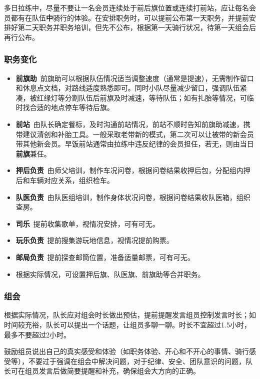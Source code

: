 \documentclass[UTF8]{ctexart}
\begin{document}
多日拉练中，尽量不要让一名会员连续处于前后旗位置或连续打前站，应让每名会员都有在队伍\textbf{中}骑行的体验。在安排职务时，可以提前公布第一天职务，并提前安排好第二天职务并职务培训，但先不公布，根据第一天骑行状况，待第一天组会后再行公布。

\subsubsection{职务变化}

\begin{itemize}[nosep,left=2em]
    \item \textbf{前旗助}\  前旗助可以根据队伍情况适当调整速度（通常是提速），无需制作留口和休息点文档，对路线适度熟悉即可。同时小队尽量减少留口，强调队伍紧凑，被红绿灯等分割队伍后前旗及时减速，等待队伍；如有扎胎等情况，可临时找合适的地点停车等待后旗。
    \item \textbf{前站}\  由队长确定餐标，及时沟通前站情况，前站不顺时告知前旗助减速，携带建议清创和补胎工具。一般采取老带新的模式，第二次可以让被带的新会员带其他新会员。早饭前站通常由拉练中违反纪律的会员担任，若无，则由当日\textbf{前旗}兼任。
    \item \textbf{押后负责}\  由师父培训，制作车况问卷，根据问卷结果收押后包，分配组内押后和车辆对应关系，组织检车。
    \item \textbf{队医负责}\  由队医组培训，制作身体状况问卷，根据问卷结果收队医箱，组织查房。
    \item \textbf{司乐}\  提前收集歌单，视情况安排，可有可无。
    \item \textbf{玩乐负责}\  提前搜集游玩地信息，视情况提前购票。
    \item \textbf{邮局负责}\  提前探查邮筒位置，准备适量邮票，可有可无。
    \item 根据实际情况，可设置押后旗、队医旗、前旗助等合并职务。
\end{itemize}

\subsubsection{组会}

根据实际情况，队长应对组会时长做出预估，提前提醒发言组员控制发言时长；如时间较充裕，队长可以提出一个话题，让组员多聊一聊。时长不宜超过1.5小时，最多不要超过2小时。

鼓励组员说出自己的真实感受和体验（如职务体验、开心和不开心的事情、骑行感受等），不要过于强调在组会中解决问题，对于纪律、安全、团队意识的问题，队长可在组员发言后做简要提醒和补充，确保组会大方向的正确。
\end{document}
